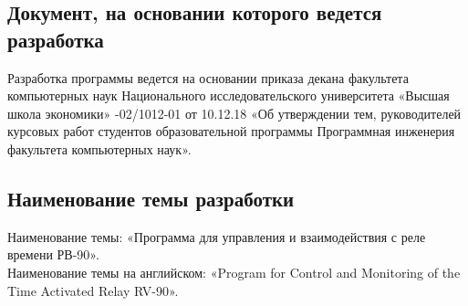 \subsection{Документ, на основании которого ведется разработка}
Разработка программы ведется на основании приказа декана факультета компьютерных наук  
Национального исследовательского университета «Высшая школа экономики» 
-02/1012-01 от 10.12.18
«Об  утверждении  тем,  руководителей  курсовых  работ  студентов
образовательной  программы  Программная  инженерия 
факультета 
компьютерных наук».


\subsection{Наименование темы разработки}
Наименование темы: «Программа для управления и взаимодействия с реле времени РВ-90». \\
Наименование темы на английском: «Program for Control and Monitoring of the Time Activated Relay RV-90». \\

